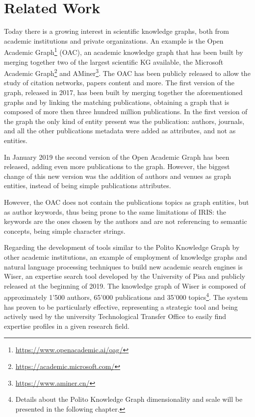 \documentclass[%
    corpo=13.5pt,
    twoside,
    oldstyle,
    tipotesi=magistrale,
    greek,
    evenboxes
]{toptesi}
\begin{document}
\chapter{Related Work}

Today there is a growing interest in scientific
knowledge graphs, both from academic institutions and private organizations.
An example is the Open Academic
Graph\footnote{\url{https://www.openacademic.ai/oag/}} (OAC), an academic
knowledge graph that has been built by merging together two of the largest
scientific KG available, the Microsoft Academic
Graph\footnote{\url{https://academic.microsoft.com/}}
and AMiner\footnote{\url{https://www.aminer.cn/}}.
The OAC has been publicly released to allow
the study of citation networks, papers content and more.
The first version of the graph, released in 2017, has been
built by merging together the aforementioned graphs and by linking the
matching publications, obtaining a graph that is composed of more then three
hundred million publications. In the first version of the graph the only kind of
entity present was the publication: authors, journals, and all
the other publications metadata were added as attributes, and not as entities.

In January 2019 the second version of the Open Academic Graph has been
released, adding even more publications to the graph.
However, the biggest change of this new
version was the addition of authors and venues as graph entities,
instead of being simple publications attributes.

However, the OAC does not contain the publications topics as graph
entities, but as author keywords, thus being prone to the same limitations of
IRIS: the keywords are the ones chosen by the authors and are not
referencing to semantic concepts, being simple character strings.
\newline

Regarding the development of tools similar to the Polito Knowledge Graph
by other academic institutions, an example of employment of knowledge graphs
and natural language processing techniques to build new academic search engines
is Wiser\cite{cifariello2019}, an
expertise search tool developed by the University of Pisa and publicly released
at the beginning of 2019.
The knowledge graph of Wiser is composed of approximately 1'500 authors, 65'000 publications
and 35'000 topics\footnote{Details about the Polito Knowledge Graph dimensionality and scale
will be presented in the following chapter.}.
The system has proven to be particularly effective, representing a strategic
tool and being actively used by the university Technological Transfer Office to
easily find expertise profiles in a given research field.
\newline
\end{document}
